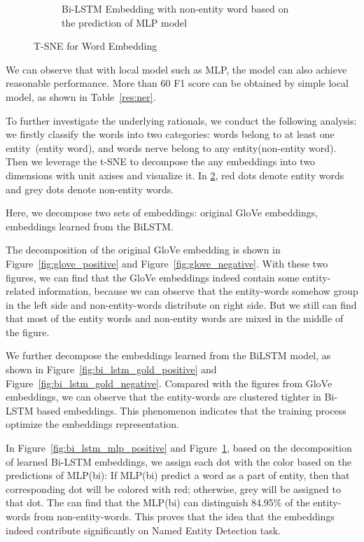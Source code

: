 \documentclass{article}
\begin{document}
\begin{figure}[t]
\begin{subfigure}[t]{0.24\textwidth}
		\caption{Bi-LSTM Embedding with non-entity word based on the prediction of MLP model}
		\label{fig:bi_lstm_mlp_negative}
	\end{subfigure}
	\caption{T-SNE for Word Embedding}
	\label{fig:embedding}
\end{figure}

We can observe that with local model such as MLP, the model can also achieve reasonable performance. More than 60 F1 score can be obtained by simple local model, as shown in Table~\ref{res:ner}. %

To further investigate the underlying rationals, we conduct the following analysis: we firstly classify the words into two categories: words belong to at least one entity~(entity word), and words nerve belong to any entity(non-entity word). Then we leverage the t-SNE to decompose the any embeddings into two dimensions with unit axises and visualize it. In \ref{fig:embedding}, red dots denote entity words and grey dots denote non-entity words. 

Here, we decompose two sets of embeddings: original GloVe embeddings, embeddings learned from the BiLSTM.

The decomposition of the original GloVe embedding is shown in Figure~\ref{fig:glove_positive} and Figure~\ref{fig:glove_negative}. With these two figures, we can find that the GloVe embeddings indeed contain some entity-related information, because we can observe that the entity-words somehow group in the left side and non-entity-words distribute on right side. But we still can find that most of the entity words and non-entity words are mixed in the middle of the figure. 

We further decompose the embeddings learned from the BiLSTM model, as shown in Figure~\ref{fig:bi_lstm_gold_positive} and Figure~\ref{fig:bi_lstm_gold_negative}. Compared with the figures from GloVe embeddings, we can observe that the entity-words are clustered tighter in Bi-LSTM based embeddings. This phenomenon indicates that the training process optimize the embeddings representation.

In Figure~\ref{fig:bi_lstm_mlp_positive} and Figure~\ref{fig:bi_lstm_mlp_negative}, based on the decomposition of learned Bi-LSTM embeddings, we assign each dot with the color based on the predictions of MLP(bi): If MLP(bi) predict a word as a part of entity, then that corresponding dot will be colored with red; otherwise, grey will be assigned to that dot. The can find that the MLP(bi) can distinguish 84.95\% of the entity-words from non-entity-words. This proves that the idea that the embeddings indeed contribute significantly on Named Entity Detection task.
\end{document}
